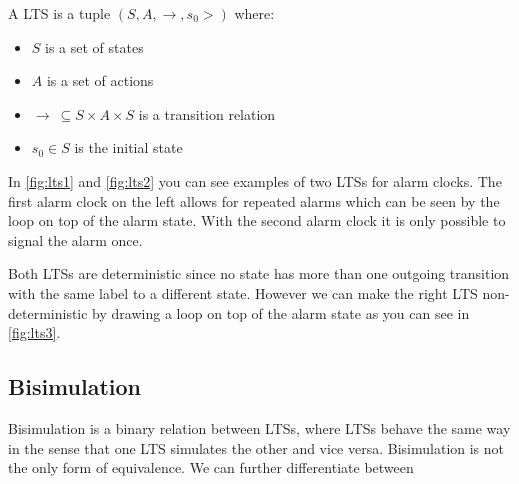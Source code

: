 \documentclass{clseminar}
\begin{document}
  A LTS is a tuple $(S, A, \to,s_0>)$ where: \\

  \begin{itemize}[noitemsep]
    \item $S$ is a set of states \\
    \item $A$ is a set of actions \\
    \item $\to\ \subseteq S \times A \times S$ is a transition relation \\
    \item $s_0 \in S$ is the initial state \\
  \end{itemize}

  \begin{figure}[!ht]
    \begin{minipage}{.5\linewidth}
      \centering
      
      \label{fig:lts1}
    \end{minipage}
    \begin{minipage}{.5\linewidth}
      \centering
      
      \label{fig:lts2}
    \end{minipage}
  \end{figure}

  In \autoref{fig:lts1} and \autoref{fig:lts2} you can see examples of two LTSs for alarm clocks. The first alarm clock on the left allows for repeated alarms which can be seen by the loop on top of the alarm state. With the second alarm clock it is only possible to signal the alarm once.

  Both LTSs are deterministic since no state has more than one outgoing transition with the same label to a different state. However we can make the right LTS non-deterministic by drawing a loop on top of the alarm state as you can see in \autoref{fig:lts3}. \\

  \begin{figure}[!ht]
    \centering
    
    \caption{}
    \label{fig:lts3}
  \end{figure}

  \subsection{Bisimulation}
  Bisimulation is a binary relation between LTSs, where LTSs behave the same way in the sense
  that one LTS simulates the other and vice versa. \cite{bisimulation_wiki} Bisimulation is not the only form of equivalence. We can further differentiate between
\end{document}
